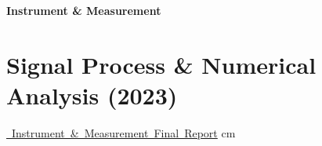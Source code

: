 \documentclass[10pt, letterpaper]{article}
\let\hrefWithoutArrow\href
\renewcommand{\href}[2]{\hrefWithoutArrow{#1}{\ifthenelse{\equal{#2}{}}{ }{#2 }\raisebox{.15ex}{\footnotesize \faExternalLink*}}}
\begin{document}
    \newpage
    {\fontsize{30pt}{30pt} \textbf{Instrument \& Measurement}} %

    \vspace{0.3cm}

    \section{Signal Process \& Numerical Analysis (2023)}

    \normalsize
    \mbox{\hrefWithoutArrow{https://github.com/liu092111/College_Portfolio/blob/0d5be6fa66553ebed94cd609794cb3832255d13b/Instrument\%20and\%20Measurement/Instrument\%20\%26\%20Measurement\%20Final\%20Report.pdf}{{\footnotesize\faLink}\hspace*{0.13cm} Instrument \& Measurement Final Report}}%
     cm%
\end{document}
